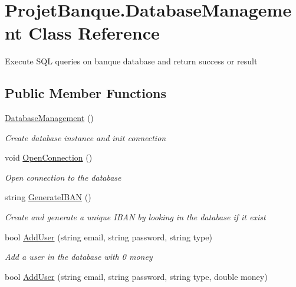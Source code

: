 \hypertarget{class_projet_banque_1_1_database_management}{}\section{Projet\+Banque.\+Database\+Management Class Reference}
\label{class_projet_banque_1_1_database_management}


Execute S\+QL queries on banque database and return success or result  


\subsection*{Public Member Functions}
\begin{DoxyCompactItemize}
\item 
\mbox{\hyperlink{class_projet_banque_1_1_database_management_a595d794798b5b753d9d43c623a679abc}{Database\+Management}} ()
\begin{DoxyCompactList}\small\item\em Create database instance and init connection \end{DoxyCompactList}\item 
void \mbox{\hyperlink{class_projet_banque_1_1_database_management_ae0af13394741c4671c86ffb098e281e7}{Open\+Connection}} ()
\begin{DoxyCompactList}\small\item\em Open connection to the database \end{DoxyCompactList}\item 
string \mbox{\hyperlink{class_projet_banque_1_1_database_management_a9564153cbc9e0d832508cc2a6d51932c}{Generate\+I\+B\+AN}} ()
\begin{DoxyCompactList}\small\item\em Create and generate a unique I\+B\+AN by looking in the database if it exist \end{DoxyCompactList}\item 
bool \mbox{\hyperlink{class_projet_banque_1_1_database_management_acf89f88775d4c333e5b17f76a4913530}{Add\+User}} (string email, string password, string type)
\begin{DoxyCompactList}\small\item\em Add a user in the database with 0 money \end{DoxyCompactList}\item 
bool \mbox{\hyperlink{class_projet_banque_1_1_database_management_a8897afb1154de9e27b3823465a9af0eb}{Add\+User}} (string email, string password, string type, double money)

\end{DoxyCompactItemize}
